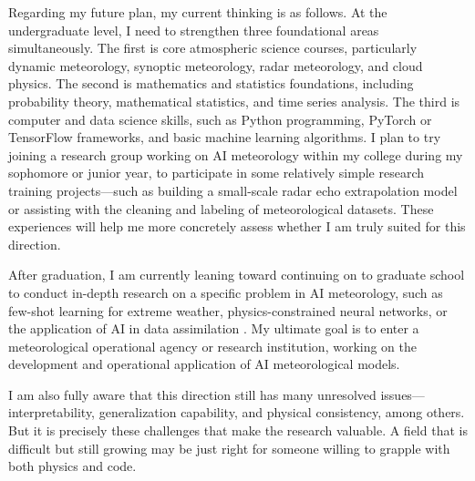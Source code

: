 \documentclass{article}
\begin{document}
Regarding my future plan, my current thinking is as follows. At the undergraduate level, I need to strengthen three foundational areas simultaneously. The first is core atmospheric science courses, particularly dynamic meteorology, synoptic meteorology, radar meteorology, and cloud physics. The second is mathematics and statistics foundations, including probability theory, mathematical statistics, and time series analysis. The third is computer and data science skills, such as Python programming, PyTorch or TensorFlow frameworks, and basic machine learning algorithms. I plan to try joining a research group working on AI meteorology within my college during my sophomore or junior year, to participate in some relatively simple research training projects—such as building a small-scale radar echo extrapolation model or assisting with the cleaning and labeling of meteorological datasets. These experiences will help me more concretely assess whether I am truly suited for this direction.

After graduation, I am currently leaning toward continuing on to graduate school to conduct in-depth research on a specific problem in AI meteorology, such as few-shot learning for extreme weather, physics-constrained neural networks, or the application of AI in data assimilation \cite{Geer2020Machine}. My ultimate goal is to enter a meteorological operational agency or research institution, working on the development and operational application of AI meteorological models.

I am also fully aware that this direction still has many unresolved issues—interpretability, generalization capability, and physical consistency, among others. But it is precisely these challenges that make the research valuable. A field that is difficult but still growing may be just right for someone willing to grapple with both physics and code.
\end{document}
